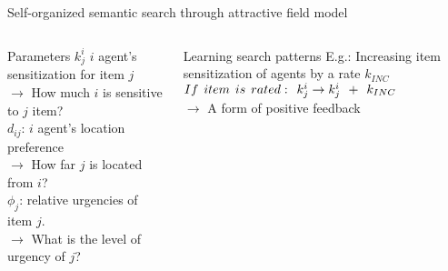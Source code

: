 \documentclass{beamer}
\begin{document}
\begin{frame}[t]{Self-organized semantic search through attractive field model}
\begin{columns}
\begin{block}{Parameters}
\small
\alert{$k_{j}^{i}$}   $i$ agent's \alert{sensitization} for item  $j$\\
$\rightarrow$ \scriptsize How much $i$ is sensitive to $j$ item?\\
\small
\alert{$d_{ij}$:} $i$ agent's \alert{location preference}\\
$\rightarrow$ \scriptsize How far $j$ is located from $i$?\\
\small
\alert{$\phi _{j}$:} \alert{relative urgencies} of item $j$.\\
$\rightarrow$ \scriptsize What is the level of urgency of $j$?  
\end{block}

\vspace*{-0.45cm}
\begin{block}{Learning search patterns}
\small E.g.: Increasing item sensitization of agents by a rate $k_{INC}$\\
\vspace*{0.25cm}
\alert{ 
$ If\hspace*{0.15cm}item\hspace*{0.15cm}is\hspace*{0.15cm}rated:\hspace*{0.15cm}  k^i_j \rightarrow   k^i_j \hspace*{0.15cm} + \hspace*{0.15cm} k_{INC}
$ }\\
\vspace*{0.25cm}
$\rightarrow$ \scriptsize A form of \alert{positive feedback} 
\end{block}
\end{columns}
\end{frame}
\end{document}
